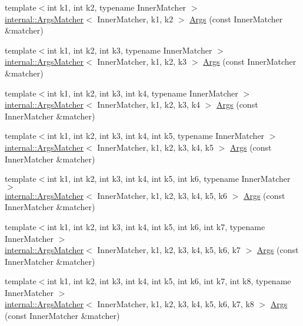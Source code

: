 \begin{DoxyCompactItemize}
\item 
{\footnotesize template$<$int k1, int k2, typename Inner\+Matcher $>$ }\\\hyperlink{classtesting_1_1internal_1_1_args_matcher}{internal\+::\+Args\+Matcher}$<$ Inner\+Matcher, k1, k2 $>$ \hyperlink{namespacetesting_a663409e441584c81f496e9c98fd3453c}{Args} (const Inner\+Matcher \&matcher)
\item 
{\footnotesize template$<$int k1, int k2, int k3, typename Inner\+Matcher $>$ }\\\hyperlink{classtesting_1_1internal_1_1_args_matcher}{internal\+::\+Args\+Matcher}$<$ Inner\+Matcher, k1, k2, k3 $>$ \hyperlink{namespacetesting_abd3ddae153e1c452b7625808cc4d820b}{Args} (const Inner\+Matcher \&matcher)
\item 
{\footnotesize template$<$int k1, int k2, int k3, int k4, typename Inner\+Matcher $>$ }\\\hyperlink{classtesting_1_1internal_1_1_args_matcher}{internal\+::\+Args\+Matcher}$<$ Inner\+Matcher, k1, k2, k3, k4 $>$ \hyperlink{namespacetesting_aeff7e644fd00516c3519fe8c0dc1aee2}{Args} (const Inner\+Matcher \&matcher)
\item 
{\footnotesize template$<$int k1, int k2, int k3, int k4, int k5, typename Inner\+Matcher $>$ }\\\hyperlink{classtesting_1_1internal_1_1_args_matcher}{internal\+::\+Args\+Matcher}$<$ Inner\+Matcher, k1, k2, k3, k4, k5 $>$ \hyperlink{namespacetesting_aede9fd33cce0d21f5e31ba10a0706827}{Args} (const Inner\+Matcher \&matcher)
\item 
{\footnotesize template$<$int k1, int k2, int k3, int k4, int k5, int k6, typename Inner\+Matcher $>$ }\\\hyperlink{classtesting_1_1internal_1_1_args_matcher}{internal\+::\+Args\+Matcher}$<$ Inner\+Matcher, k1, k2, k3, k4, k5, k6 $>$ \hyperlink{namespacetesting_abc92e87b4a9cad372b082d81479f3d48}{Args} (const Inner\+Matcher \&matcher)
\item 
{\footnotesize template$<$int k1, int k2, int k3, int k4, int k5, int k6, int k7, typename Inner\+Matcher $>$ }\\\hyperlink{classtesting_1_1internal_1_1_args_matcher}{internal\+::\+Args\+Matcher}$<$ Inner\+Matcher, k1, k2, k3, k4, k5, k6, k7 $>$ \hyperlink{namespacetesting_a9a9ef7a866b397430527076e342817f9}{Args} (const Inner\+Matcher \&matcher)
\item 
{\footnotesize template$<$int k1, int k2, int k3, int k4, int k5, int k6, int k7, int k8, typename Inner\+Matcher $>$ }\\\hyperlink{classtesting_1_1internal_1_1_args_matcher}{internal\+::\+Args\+Matcher}$<$ Inner\+Matcher, k1, k2, k3, k4, k5, k6, k7, k8 $>$ \hyperlink{namespacetesting_ae8a4e8e1b8eb87c9f1e5f02519da7fce}{Args} (const Inner\+Matcher \&matcher)

\end{DoxyCompactItemize}
